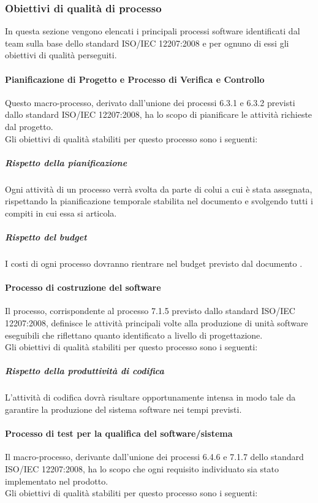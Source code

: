 		\subsubsection{Obiettivi di qualità di processo}
		In questa sezione vengono elencati i principali processi software identificati dal team sulla base dello standard ISO/IEC 12207:2008 e per ognuno di essi gli obiettivi di qualità perseguiti.
			\paragraph{Pianificazione di Progetto e Processo di Verifica e Controllo }
			Questo macro-processo, derivato dall'unione dei processi 6.3.1 e 6.3.2 previsti dallo standard ISO/IEC 12207:2008, ha lo scopo di pianificare le attività richieste dal progetto.
			\\Gli obiettivi di qualità stabiliti per questo processo sono i seguenti:

				\subparagraph{Rispetto della pianificazione}
				Ogni attività di un processo verrà svolta da parte di colui a cui è stata assegnata, rispettando la pianificazione temporale stabilita nel documento \PdP{} e svolgendo tutti i compiti in cui essa si articola.
				\subparagraph{Rispetto del budget}
				I costi di ogni processo dovranno rientrare nel budget previsto dal documento \PdP.
				
			\paragraph{Processo di costruzione del software}
			Il processo, corrispondente al processo 7.1.5 previsto dallo standard ISO/IEC 12207:2008, definisce le attività principali volte alla produzione di unità software eseguibili che riflettano quanto identificato a livello di progettazione.
			\\Gli obiettivi di qualità stabiliti per questo processo sono i seguenti:

				\subparagraph{Rispetto della produttività di codifica}
				L'attività di codifica dovrà risultare opportunamente intensa in modo tale da garantire la produzione del sistema software nei tempi previsti.
				
			\paragraph{Processo di test per la qualifica del software/sistema}
			Il macro-processo, derivante dall'unione dei processi 6.4.6 e 7.1.7 dello standard ISO/IEC 12207:2008, ha lo scopo che ogni requisito individuato sia stato implementato nel prodotto.
			\\Gli obiettivi di qualità stabiliti per questo processo sono i seguenti:

